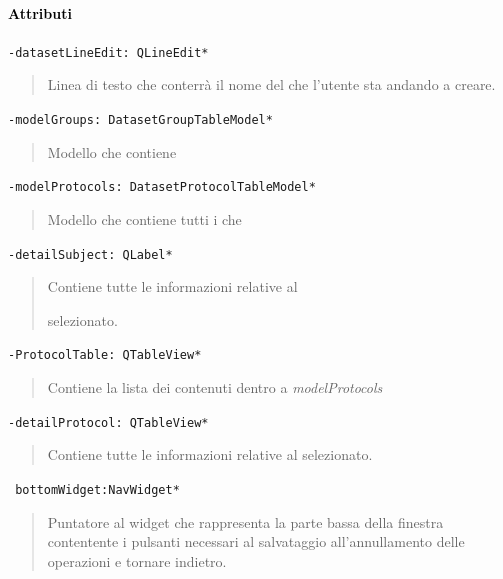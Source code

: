 \paragraph{\textcolor{black}{Attributi\\}}
\color{teal}\verb!-datasetLineEdit: QLineEdit*!
\begin{quote}
\color{black}Linea di testo che conterrà il nome del \dataset{} che l'utente sta andando a creare.
\end{quote}
\color{teal}\verb!-modelGroups: DatasetGroupTableModel*!
\begin{quote}
\color{black}Modello che contiene 
\end{quote}
\color{teal}\verb!-modelProtocols: DatasetProtocolTableModel*!
\begin{quote}
\color{black}Modello che contiene tutti i \protocol{} che
\end{quote}
\color{teal}\verb!-detailSubject: QLabel*!
\begin{quote}
\color{black}Contiene tutte le informazioni relative al \subject{} selezionato.
\end{quote}
\color{teal}\verb!-ProtocolTable: QTableView*!
\begin{quote}
\color{black}Contiene la lista dei \protocol{} contenuti dentro a \emph{modelProtocols}
\end{quote}
\color{teal}\verb!-detailProtocol: QTableView*!
\begin{quote}
\color{black}Contiene tutte le informazioni relative al \protocol{} selezionato.
\end{quote}
\color{teal}\verb! bottomWidget:NavWidget*!
\color{black} 
\begin{quote}
Puntatore al widget che rappresenta la parte bassa della finestra contentente i pulsanti necessari al salvataggio all'annullamento delle operazioni e tornare indietro.
\end{quote}
